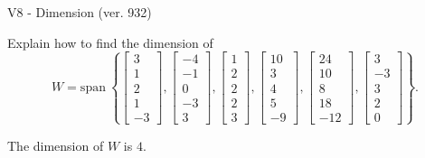 \begin{exercise}
  \begin{exerciseTitle}V8 - Dimension (ver. 932)\end{exerciseTitle}
  \begin{exerciseStatement}
    Explain how to find the dimension of 
\[W=\mathrm{span}\ \left\{\left[\begin{array}{r}
3 \\
1 \\
2 \\
1 \\
-3
\end{array}\right] , \left[\begin{array}{r}
-4 \\
-1 \\
0 \\
-3 \\
3
\end{array}\right] , \left[\begin{array}{r}
1 \\
2 \\
2 \\
2 \\
3
\end{array}\right] , \left[\begin{array}{r}
10 \\
3 \\
4 \\
5 \\
-9
\end{array}\right] , \left[\begin{array}{r}
24 \\
10 \\
8 \\
18 \\
-12
\end{array}\right] , \left[\begin{array}{r}
3 \\
-3 \\
3 \\
2 \\
0
\end{array}\right]\right\}.\]



  \end{exerciseStatement}
  \begin{exerciseAnswer}
   The dimension of \(W\) is  \(4\).
  


  \end{exerciseAnswer}
\end{exercise}